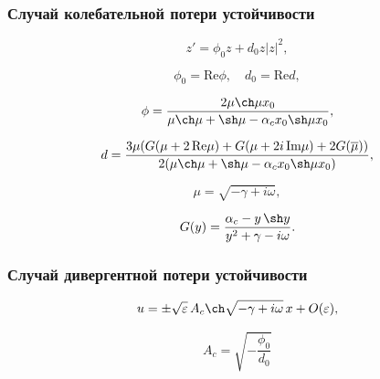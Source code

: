 \documentclass[fullscreen=true, unicode, bookmarks=false]{beamer}
\begin{document}
\begin{frame}
\frametitle{ Случай колебательной потери устойчивости }

\begin{equation}
	z' = \phi_0 z + d_0 z |z|^2,
\end{equation}

$$ \phi_0 = \mbox{Re} \phi, \quad d_0 = \mbox{Re} d, $$

\bigskip
\pause

$$ \phi = \frac{ 2 \mu \ch \mu x_0 }{ \mu \ch \mu +\sh \mu - \alpha_c x_0 \sh \mu x_0 }, $$

$$ d = \frac{ 3 \mu ( G(\mu + 2\,\mbox{Re}\mu) + G(\mu + 2i\,\mbox{Im}\mu) + 2G(\overline{\mu}) ) }{ 2 ( \mu \ch \mu +\sh \mu - \alpha_c x_0 \sh \mu x_0 ) }, $$

$$ \mu = \sqrt{-\gamma + i \omega}, $$

$$ G(y) = \frac{ \alpha_c - y\,\sh y }{ y^2 + \gamma - i\omega }. $$

\end{frame}

\begin{frame}
\frametitle{ Случай дивергентной потери устойчивости }

\begin{equation}
	u = \pm \sqrt{\varepsilon} \, A_c \ch \sqrt{-\gamma + i \omega} \, x + O(\varepsilon),
\end{equation}

\bigskip

$$ A_c = \sqrt{ - \frac{\phi_0}{d_0} } $$

\end{frame}
\end{document}
